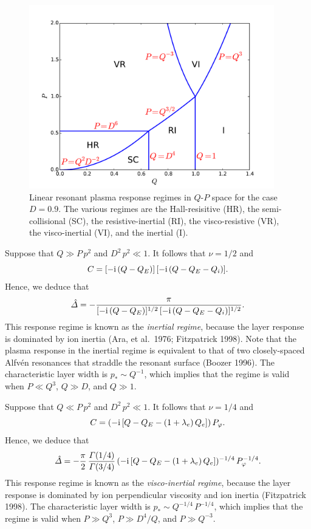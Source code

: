 \documentclass[notitlepage,12pt]{article}
\begin{document}
\begin{figure}[t]
\centerline{\includegraphics[width=0.95\textwidth]{RegimeI.pdf}}
\caption{Linear resonant plasma response regimes in $Q$-$P$ space for the case $D=0.9$. The various regimes are
the Hall-resisitive (HR), the semi-collisional (SC), the resistive-inertial (RI), the visco-resistive (VR), the visco-inertial
(VI), and the inertial (I).}\label{f1}
\end{figure}

Suppose that $Q\gg P\,p^2$ and $D^2\,p^2 \ll 1$. It follows that $\nu=1/2$ and
\begin{equation}
C = [-{\rm i}\,(Q-Q_E)]\,[-{\rm i}\,(Q-Q_E-Q_i)].
\end{equation}
Hence, we deduce that
\begin{equation}
\hat{\mit\Delta} = -\frac{\pi}{[-{\rm i}\,(Q-Q_E)]^{1/2}\,[-{\rm i}\,(Q-Q_E-Q_i)]^{1/2}}.
\end{equation}
This response regime is known as the {\em inertial regime}, because the layer response is dominated by
 ion inertia (Ara, et al.\ 1976; Fitzpatrick 1998). Note that the plasma response in the inertial regime is
 equivalent to that of two closely-spaced Alfv\'{e}n resonances that straddle the resonant surface (Boozer 1996). 
 The characteristic layer width is $p_\ast \sim Q^{-1}$,
which implies that the regime is valid when $P\ll Q^3$, $Q\gg D$, and $Q\gg 1$. 

Suppose that $Q\ll P\,p^2$ and $D^2\,p^2 \ll 1$. It follows that $\nu=1/4$ and
\begin{equation}
C = (-{\rm i}\,[Q-Q_E-(1+\lambda_e)\,Q_e])\,P_\varphi.
\end{equation}
Hence, we deduce that
\begin{equation}
\hat{\mit\Delta} =- \frac{\pi}{2}\,\frac{{\mit\Gamma}(1/4)}{{\mit\Gamma}(3/4)}\, (-{\rm i}\,[Q-Q_E-(1+\lambda_e)\,Q_e])^{-1/4}\,P_\varphi^{-1/4}.
\end{equation}
This response regime is known as the {\em visco-inertial regime}, because the layer response is dominated by
ion perpendicular viscosity and ion inertia (Fitzpatrick 1998). 
 The characteristic layer width is $p_\ast \sim Q^{-1/4}\,P^{-1/4}$,
which implies that the regime is valid when $P\gg Q^3$, $P\gg D^4/Q$, and $P\gg Q^{-3}$. 
\end{document}
